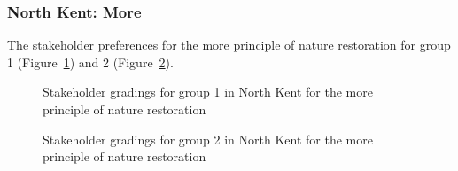 \documentclass[
  12pt,
  letterpaper,
  DIV=11,
  numbers=noendperiod]{scrartcl}
\begin{document}
\newpage{}

\subsubsection{North Kent: More}\label{north-kent-more}

The stakeholder preferences for the more principle of nature restoration
for group 1 (Figure~\ref{fig-NKMoreG1}) and 2
(Figure~\ref{fig-NKMoreG2}).

\begin{figure}[H]


\caption{\label{fig-NKMoreG1}Stakeholder gradings for group 1 in North
Kent for the more principle of nature restoration}

\end{figure}%

\begin{figure}[H]


\caption{\label{fig-NKMoreG2}Stakeholder gradings for group 2 in North
Kent for the more principle of nature restoration}

\end{figure}%
\end{document}
